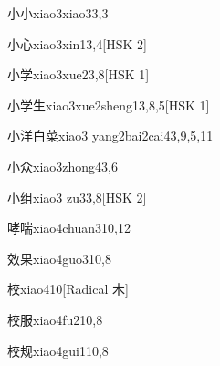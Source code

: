 \begin{entry}{小小}{xiao3xiao3}{3,3}
\end{entry}

\begin{entry}{小心}{xiao3xin1}{3,4}[HSK 2]
\end{entry}

\begin{entry}{小学}{xiao3xue2}{3,8}[HSK 1]
\end{entry}

\begin{entry}{小学生}{xiao3xue2sheng1}{3,8,5}[HSK 1]
\end{entry}

\begin{entry}{小洋白菜}{xiao3 yang2bai2cai4}{3,9,5,11}
\end{entry}

\begin{entry}{小众}{xiao3zhong4}{3,6}
\end{entry}

\begin{entry}{小组}{xiao3 zu3}{3,8}[HSK 2]
\end{entry}

\begin{entry}{哮喘}{xiao4chuan3}{10,12}
\end{entry}

\begin{entry}{效果}{xiao4guo3}{10,8}
\end{entry}

\begin{entry}{校}{xiao4}{10}[Radical 木]
\end{entry}

\begin{entry}{校服}{xiao4fu2}{10,8}
\end{entry}

\begin{entry}{校规}{xiao4gui1}{10,8}
\end{entry}

